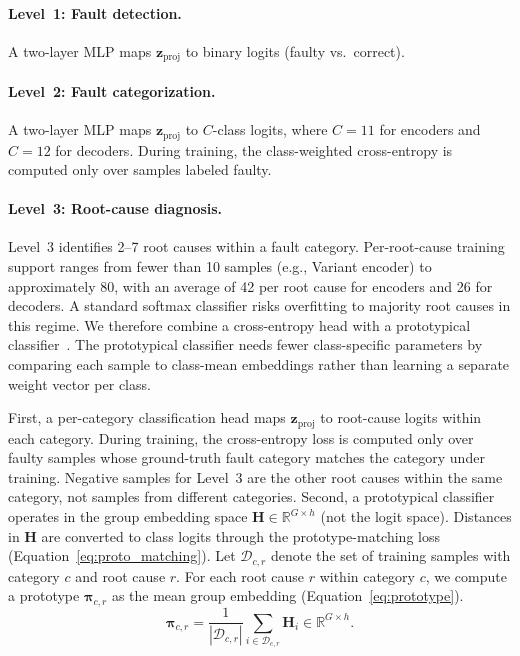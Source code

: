 \paragraph{Level~1: Fault detection.}
A two-layer MLP maps $\mathbf{z}_{\text{proj}}$ to binary logits (faulty vs.\ correct).

\paragraph{Level~2: Fault categorization.}
A two-layer MLP maps $\mathbf{z}_{\text{proj}}$ to $C$-class logits, where $C = 11$ for encoders and $C = 12$ for decoders. During training, the class-weighted cross-entropy is computed only over samples labeled faulty.

\paragraph{Level~3: Root-cause diagnosis.}
Level~3 identifies 2--7 root causes within a fault category. Per-root-cause training support ranges from fewer than 10 samples (e.g., Variant encoder) to approximately 80, with an average of 42 per root cause for encoders and 26 for decoders. A standard softmax classifier risks overfitting to majority root causes in this regime. We therefore combine a cross-entropy head with a prototypical classifier~\cite{snell2017prototypical,kamp1995prototype}. The prototypical classifier needs fewer class-specific parameters by comparing each sample to class-mean embeddings rather than learning a separate weight vector per class.

First, a per-category classification head maps $\mathbf{z}_{\text{proj}}$ to root-cause logits within each category. During training, the cross-entropy loss is computed only over faulty samples whose ground-truth fault category matches the category under training. Negative samples for Level~3 are the other root causes within the same category, not samples from different categories. Second, a prototypical classifier~\cite{snell2017prototypical,lin2022prototypical} operates in the group embedding space $\mathbf{H} \in \mathbb{R}^{G \times h}$ (not the logit space). Distances in $\mathbf{H}$ are converted to class logits through the prototype-matching loss (Equation~\ref{eq:proto_matching}). Let $\mathcal{D}_{c,r}$ denote the set of training samples with category $c$ and root cause $r$. For each root cause $r$ within category $c$, we compute a prototype $\symbf{\pi}_{c,r}$ as the mean group embedding (Equation~\ref{eq:prototype}).
\begin{equation}
\symbf{\pi}_{c,r} = \frac{1}{|\mathcal{D}_{c,r}|} \sum_{i \in \mathcal{D}_{c,r}} \mathbf{H}_i \in \mathbb{R}^{G \times h}.
\label{eq:prototype}
\end{equation}

